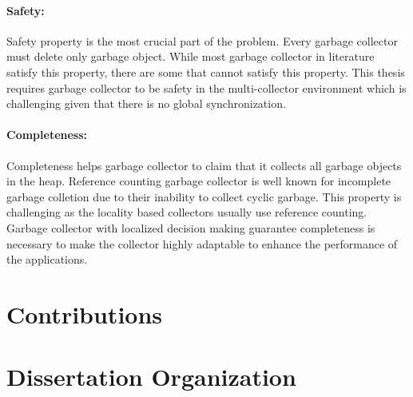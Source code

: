 \paragraph{Safety:}
	Safety property is the most crucial part of the problem. Every garbage collector must delete only garbage object. While most garbage collector in literature satisfy this property, there are some that cannot satisfy this property. This thesis requires garbage collector to be safety in the multi-collector environment which is challenging given that there is no global synchronization.
\paragraph{Completeness:}
	Completeness helps garbage collector to claim that it collects all garbage objects in the heap. Reference counting garbage collector is well known for incomplete garbage colletion due to their inability to collect cyclic garbage. This property is challenging as the locality based collectors usually use reference counting. Garbage collector with localized decision making guarantee completeness is necessary to make the collector highly adaptable to enhance the performance of the applications.
\section{Contributions}
\label{intro:contr}
\section{Dissertation Organization}
\label{intro:do}